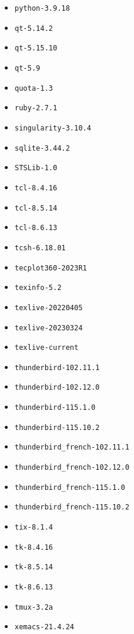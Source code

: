 \begin{itemize}
\item \verb|python-3.9.18|
\item \verb|qt-5.14.2|
\item \verb|qt-5.15.10|
\item \verb|qt-5.9|
\item \verb|quota-1.3|
\item \verb|ruby-2.7.1|
\item \verb|singularity-3.10.4|
\item \verb|sqlite-3.44.2|
\item \verb|STSLib-1.0|
\item \verb|tcl-8.4.16|
\item \verb|tcl-8.5.14|
\item \verb|tcl-8.6.13|
\item \verb|tcsh-6.18.01|
\item \verb|tecplot360-2023R1|
\item \verb|texinfo-5.2|
\item \verb|texlive-20220405|
\item \verb|texlive-20230324|
\item \verb|texlive-current|
\item \verb|thunderbird-102.11.1|
\item \verb|thunderbird-102.12.0|
\item \verb|thunderbird-115.1.0|
\item \verb|thunderbird-115.10.2|
\item \verb|thunderbird_french-102.11.1|
\item \verb|thunderbird_french-102.12.0|
\item \verb|thunderbird_french-115.1.0|
\item \verb|thunderbird_french-115.10.2|
\item \verb|tix-8.1.4|
\item \verb|tk-8.4.16|
\item \verb|tk-8.5.14|
\item \verb|tk-8.6.13|
\item \verb|tmux-3.2a|
\item \verb|xemacs-21.4.24|
\end{itemize}

